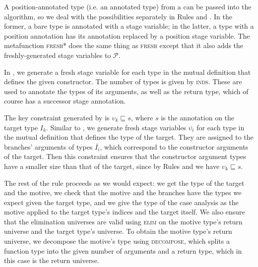 \documentclass[sigplan,10pt,anonymous,review]{acmart}
\begin{document}
A position-annotated type (i.e. an annotated \corecursive type) from a \cofixpoint can be passed into the algorithm, so we deal with the possibilities separately in Rules  and . In the former, a bare \coinductive type is annotated with a stage variable; in the latter, a \coinductive type with a position annotation has its annotation replaced by a position stage variable. The metafunction \textsc{fresh*} does the same thing as \textsc{fresh} except that it also adds the freshly-generated stage variables to $\mathcal{P}$.

In , we generate a fresh stage variable for each \coinductive type in the mutual definition that defines the given constructor. The number of types is given by \textsc{inds}. These are used to annotate the types of its \coinductive arguments, as well as the return type, which of course has a successor stage annotation.

The key constraint generated by  is $\hat{\upsilon}_k \sqsubseteq s$, where $s$ is the annotation on the target type $I_k$. Similar to , we generate fresh stage variables $\overline{\upsilon_i}$ for each \coinductive type in the mutual definition that defines the type of the target. They are assigned to the branches' arguments of types $\overline{I_i}$, which correspond to the constructor arguments of the target. Then this constraint ensures that the constructor argument types have a smaller size than that of the target, since by Rules  and  we have $\upsilon_k \sqsubseteq s$.

The rest of the rule proceeds as we would expect: we get the type of the target and the motive, we check that the motive and the branches have the types we expect given the target type, and we give the type of the case analysis as the motive applied to the target type's indices and the target itself. We also ensure that the elimination universes are valid using \textsc{elim} on the motive type's return universe and the target type's universe. To obtain the motive type's return universe, we decompose the motive's type using \textsc{decompose}, which splits a function type into the given number of arguments and a return type, which in this case is the return universe.
\end{document}
